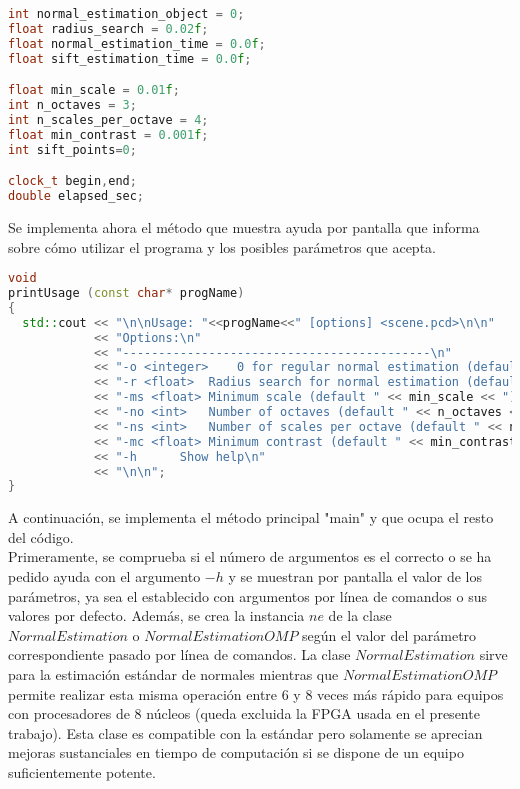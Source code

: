 \begin{lstlisting}[language=C++,breaklines]
int normal_estimation_object = 0;
float radius_search = 0.02f;
float normal_estimation_time = 0.0f;
float sift_estimation_time = 0.0f;

float min_scale = 0.01f;
int n_octaves = 3;
int n_scales_per_octave = 4;
float min_contrast = 0.001f;
int sift_points=0; 

clock_t begin,end;
double elapsed_sec;
\end{lstlisting}


Se implementa ahora el método que muestra ayuda por pantalla que informa sobre cómo utilizar el programa y los posibles parámetros que acepta.

\begin{lstlisting}[language=C++,breaklines]
void 
printUsage (const char* progName)
{
  std::cout << "\n\nUsage: "<<progName<<" [options] <scene.pcd>\n\n"
            << "Options:\n"
            << "-------------------------------------------\n"
            << "-o <integer>	0 for regular normal estimation (default), 1 for enhanced normal estimation\n"
            << "-r <float>	Radius search for normal estimation (default "<< radius_search<<")\n"
            << "-ms <float>	Minimum scale (default " << min_scale << ")\n"
            << "-no <int>	Number of octaves (default " << n_octaves << ")\n"
            << "-ns <int>	Number of scales per octave (default " << n_scales_per_octave << ")\n"
	    	<< "-mc <float>	Minimum contrast (default " << min_contrast << ")\n"
	    	<< "-h		Show help\n"
            << "\n\n";
}
\end{lstlisting}


A continuación, se implementa el método principal "main" y que ocupa el resto del código.\\
Primeramente, se comprueba si el número de argumentos es el correcto o se ha pedido ayuda con el argumento $-h$ y se muestran por pantalla el valor de los parámetros, ya sea el establecido con argumentos por línea de comandos o sus valores por defecto.
Además, se crea la instancia $ne$ de la clase $NormalEstimation$ o $NormalEstimationOMP$ según el valor del parámetro correspondiente pasado por línea de comandos. La clase $NormalEstimation$ sirve para la estimación estándar de normales mientras que $NormalEstimationOMP$ permite realizar esta misma operación entre 6 y 8 veces más rápido para equipos con procesadores de 8 núcleos (queda excluida la FPGA usada en el presente trabajo). Esta clase es compatible con la estándar pero solamente se aprecian mejoras sustanciales en tiempo de computación si se dispone de un equipo suficientemente potente.

